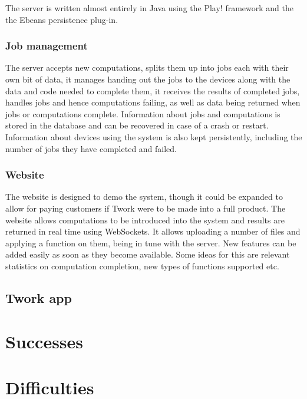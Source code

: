 \documentclass[a4paper,10pt]{article}
\begin{document}
The server is written almost entirely in Java using the Play! framework and the the Ebeans persistence plug-in.

\subsubsection{Job management}
The server accepts new computations, splits them up into jobs each with their own bit of data, it manages handing out the jobs to the devices along with
the data and code needed to complete them, it receives the results of completed jobs, handles jobs and hence computations failing, as well
as data being returned when jobs or computations complete.
Information about jobs and computations is stored in the database and can be recovered
in case of a crash or restart.
Information about devices using the system is also kept persistently, including the number of jobs they have completed and failed.

\subsubsection{Website}


The website is designed to demo the system, though it could be expanded to allow for paying customers if Twork were to be made into a full product.
The website allows computations to be introduced into the system and results are returned in real time using WebSockets. It allows uploading a number of files and applying a function on them, being in tune with the server. New features can be added easily as soon as they become available. Some ideas for this are relevant statistics on computation completion, new types of functions supported etc.


\subsection{Twork app}

\section{Successes}


\section{Difficulties}
\end{document}

